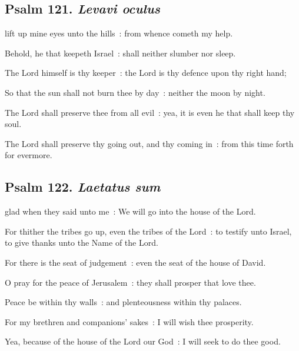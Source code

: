 \subsection{Psalm 121. \textit{Levavi oculus}}


 lift up mine eyes unto the hills~: from whence cometh my help.\par
{}
Behold, he that keepeth Israel~: shall neither slumber nor sleep.\par
{}The Lord himself is thy keeper~: the Lord is thy defence upon thy right hand;\par
{}So that the sun shall not burn thee by day~: neither the moon by night.\par
{}The Lord shall preserve thee from all evil~: yea, it is even he that shall keep thy soul.\par
{}The Lord shall preserve thy going out, and thy coming in~: from this time forth for evermore.\par


\clearpage
\subsection{Psalm 122. \textit{Laetatus sum}}


 glad when they said unto me~: We will go into the house of the Lord.\par
{}
For thither the tribes go up, even the tribes of the Lord~: to testify unto Israel, to give thanks unto the Name of the Lord.\par
{}For there is the seat of judgement~: even the seat of the house of David.\par
{}O pray for the peace of Jerusalem~: they shall prosper that love thee.\par
{}Peace be within thy walls~: and plenteousness within thy palaces.\par
{}For my brethren and companions' sakes~: I will wish thee prosperity.\par
{}Yea, because of the house of the Lord our God~: I will seek to do thee good.\par

